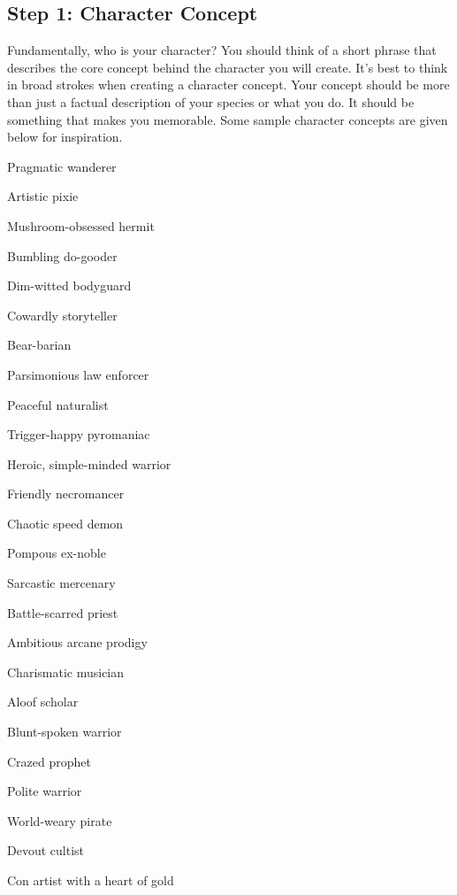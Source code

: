     \subsection{Step 1: Character Concept}

        Fundamentally, who is your character?
        You should think of a short phrase that describes the core concept behind the character you will create.
        It's best to think in broad strokes when creating a character concept.
        Your concept should be more than just a factual description of your species or what you do.
        It should be something that makes you memorable.
        Some sample character concepts are given below for inspiration.

        \begin{raggeditemize}
            \item Pragmatic wanderer
            \item Artistic pixie
            \item Mushroom-obsessed hermit
            \item Bumbling do-gooder
            \item Dim-witted bodyguard
            \item Cowardly storyteller
            \item Bear-barian
            \item Parsimonious law enforcer
            \item Peaceful naturalist
            \item Trigger-happy pyromaniac
            \item Heroic, simple-minded warrior
            \item Friendly necromancer
            \item Chaotic speed demon
            \item Pompous ex-noble
            \item Sarcastic mercenary
            \item Battle-scarred priest
            \item Ambitious arcane prodigy
            \item Charismatic musician
            \item Aloof scholar
            \item Blunt-spoken warrior
            \item Crazed prophet
            \item Polite warrior
            \item World-weary pirate
            \item Devout cultist
            \item Con artist with a heart of gold
        \end{raggeditemize}

